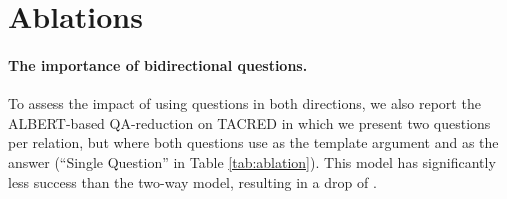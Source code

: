 \documentclass[11pt]{article}
\begin{document}
\section{Ablations} \label{sec:ablation}

\begin{table}[t]
\caption{{\bf Importance of bidirectional questions.} The SP model with two questions combined via OR (full setup), vs. a single question.  Asking two questions instead of one significantly increase the model performance.}
\label{tab:ablation}
\end{table}

\begin{table}[t]
\caption{{\bf Answer combination method.} TACRED performance when using the AND combination (in brackets, the corresponding OR combination). Using AND substantially increase precision, while dropping recall, resulting in a lower F score on all models.}
\label{tab:and}
\end{table}

\paragraph{The importance of bidirectional questions.} To assess the impact of using questions in both directions, we also report the ALBERT-based QA-reduction on TACRED in which we present two questions per relation, but where both questions use  as the template argument and  as the answer (``Single Question'' in Table \ref{tab:ablation}). This model has significantly less success than the two-way model, resulting in a drop of . 
\end{document}
